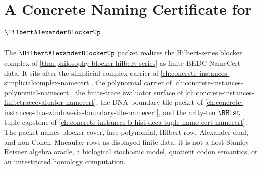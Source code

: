 \chapter{A Concrete Naming Certificate for $\HilbertAlexanderBlockerUp$}
\label{ch:concrete-instances-hilbert-alexander-blocker-namecert}

The $\HilbertAlexanderBlockerUp$ packet realizes the Hilbert-series blocker complex of \autoref{thm:philosophy-blocker-hilbert-series} as finite BEDC NameCert data. It sits after the simplicial-complex carrier of \autoref{ch:concrete-instances-simplicialcomplex-namecert}, the polynomial carrier of \autoref{ch:concrete-instances-polynomial-namecert}, the finite-trace evaluator surface of \autoref{ch:concrete-instances-finitetraceevaluator-namecert}, the DNA boundary-tile packet of \autoref{ch:concrete-instances-dna-window-six-boundary-tile-namecert}, and the arity-ten $\BHist$ tuple capstone of \autoref{ch:concrete-instances-b-hist-deca-tuple-name-cert-namecert}. The packet names blocker-cover, face-polynomial, Hilbert-row, Alexander-dual, and non-Cohen--Macaulay rows as displayed finite data; it is not a host Stanley--Reisner algebra oracle, a biological stochastic model, quotient codon semantics, or an unrestricted homology computation.

